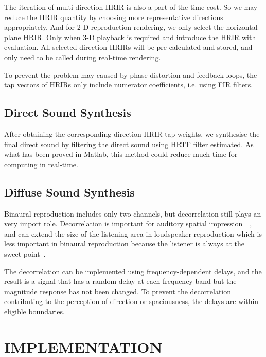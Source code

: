 \documentclass[10pt, a4paper, twocolumn]{article} %
\begin{document}
The iteration of multi-direction HRIR is also a part of the time cost. So we may reduce the HRIR quantity by choosing more representative directions appropriately. And for 2-D reproduction rendering, we only select the horizontal plane HRIR. Only when 3-D playback is required and introduce the HRIR with evaluation. All selected direction HRIRs will be pre calculated and stored, and only need to be called during real-time rendering.

To prevent the problem may caused by phase distortion and feedback loops, the tap vectors of HRIRs only include numerator coefficients, i.e. using FIR filters.

\subsection{Direct Sound Synthesis}

After obtaining the corresponding direction HRIR tap weights, we synthesise the final direct sound by filtering the direct sound using HRTF filter estimated. As what has been proved in Matlab, this method could reduce much time for computing in real-time.

\subsection{Diffuse Sound Synthesis}

Binaural reproduction includes only two channels, but decorrelation still plays an very import role. Decorrelation is important  for auditory spatial impression~\parencite{Reference6}~\parencite{Reference7}, and can extend the size of the listening area in loudspeaker reproduction which is less important in binaural reproduction because the listener is always at the sweet point~\parencite{Reference7}.

The decorrelation can be implemented using frequency-dependent delays, and the result is a signal that has a random delay at each frequency band but the magnitude response has not been changed\parencite{Reference8}. To prevent the decorrelation contributing to the perception of direction or spaciousness, the delays are within eligible boundaries.


\section{IMPLEMENTATION}
\end{document}
